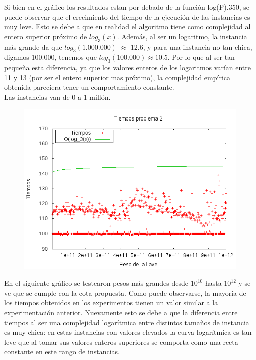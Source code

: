 Si bien en el gráfico los resultados estan por debado de la función log(P).350, se puede observar que el crecimiento del tiempo de la ejecución de las instancias es muy leve. Esto se debe a que en realidad el algoritmo tiene como complejidad al entero superior próximo de $log_3(x)$. Además, al ser un logaritmo, la instancia más grande da que $log_3(1.000.000)$ $\approx$ 12.6, y para una instancia no tan chica, digamos 100.000, tenemos que $log_3(100.000) \approx 10.5$. Por lo que al ser tan pequeña esta diferencia, ya que los valores enteros de los logaritmos varían entre 11 y 13 (por ser el entero superior mas próximo), la complejidad empírica obtenida pareciera tener un comportamiento constante.
\\
Las instancias van de 0 a 1 millón.


\begin{figure}[H]
    \centering
    \includegraphics[width=15cm]{./imagenes/tiemposEj2.png}
\end{figure}


En el siguiente gráfico se testearon pesos más grandes desde $10^{10}$ hasta $10^{12}$ y se ve que se cumple con la cota propuesta. Como puede observarse, la mayoría de los tiempos obtenidos en los experimentos tienen un valor similar a la experimentación anterior. Nuevamente esto se debe a que la diferencia entre tiempos al ser una complejidad logarítmica entre distintos tamaños de instancia es muy chica: en estas instancias con valores elevados la curva logarítmica es tan leve que al tomar sus valores enteros superiores se comporta como una recta constante en este rango de instancias.


